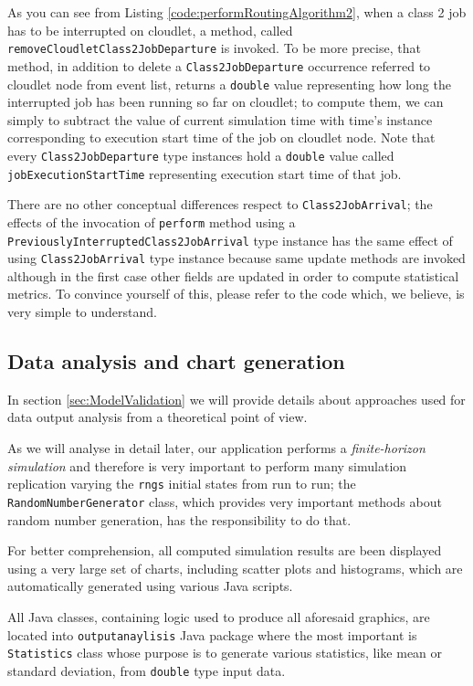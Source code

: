 \documentclass[10pt,a4paper]{article}
\begin{document}
As you can see from Listing \ref{code:performRoutingAlgorithm2}, when a class 2 job has to be interrupted on cloudlet, a method, called \texttt{removeCloudletClass2JobDeparture} is invoked. To be more precise, that method, in addition to delete a \texttt{Class2JobDeparture} occurrence referred to cloudlet node from event list, returns a \texttt{double} value representing how long the interrupted job has been running so far on cloudlet; to compute them, we can simply to subtract the value of current simulation time with time's instance corresponding to execution start time of the job on cloudlet node. Note that every \texttt{Class2JobDeparture} type instances hold a \texttt{double} value called \texttt{jobExecutionStartTime} representing execution start time of that job.

There are no other conceptual differences respect to \texttt{Class2JobArrival}; the effects of the invocation of \texttt{perform} method using a \texttt{PreviouslyInterruptedClass2JobArrival} type instance has the same effect of using \texttt{Class2JobArrival} type instance because same update methods are invoked although in the first case other fields are updated in order to compute statistical metrics. To convince yourself of this, please refer to the code which, we believe, is very simple to understand.

\subsection{Data analysis and chart generation}

In section \ref{sec:ModelValidation} we will provide details about approaches used for data output analysis from a theoretical point of view. 

As we will analyse in detail later, our application performs a \textit{finite-horizon simulation} and therefore is very important to perform many simulation replication varying the \texttt{rngs} initial states from run to run; the \texttt{RandomNumberGenerator} class, which provides very important methods about random number generation, has the responsibility to do that.

For better comprehension, all computed simulation results are been displayed using a very large set of charts, including scatter plots and histograms, which are automatically generated using various Java scripts.

All Java classes, containing logic used to produce all aforesaid graphics, are located into \texttt{outputanaylisis} Java package where the most important is \texttt{Statistics} class whose purpose is to generate various statistics, like mean or standard deviation, from \texttt{double} type input data. 
\end{document}
